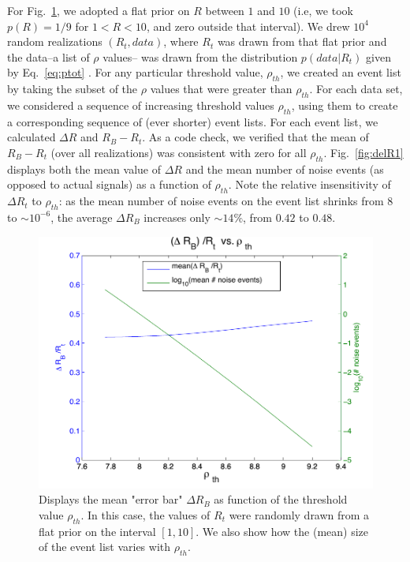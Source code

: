 \documentclass[aps,prd]{revtex4-1}
\begin{document}
For Fig.~\ref{fig:delRb}, we adopted a flat prior on $R$ between $1$ and $10$ (i.e, we took
$p(R) = 1/9$  for $1 < R <10$, and  zero outside that interval).  
We drew $10^4$ 
random realizations $(R_t, data)$, where $R_t$ was drawn from that flat prior and the data--a list of $\rho$ values-- was drawn from the distribution $p(data|R_t)$ given by Eq.~\ref{eq:ptot} .  For any particular threshold value, $\rho_{th}$, we created an  event list by taking the subset of the $\rho$ values
that were greater than $\rho_{th}$.  For each data set, we considered a sequence of increasing threshold  values $\rho_{th}$, using them to create a corresponding sequence of (ever shorter)  event lists.  For each event list, we calculated $\Delta R$ and $R_B - R_t$.
As a code check, we verified that the mean of $R_B - R_t$ (over all realizations) was consistent with zero for all $\rho_{th}$.  Fig.~\ref{fig:delR1} displays both the mean value of $\Delta R$ and the mean number of noise events (as opposed to actual signals) as a function of $\rho_{th}$. 
Note the relative insensitivity of  $\Delta R_t$ to $\rho_{th}$:  as the mean
number of noise events on the event list shrinks from $8$ to $\sim 10^{-6}$, 
the average $\Delta R_B$ increases only $\sim 14\%$, from $0.42$ to $0.48$.

\begin{figure}
\includegraphics[width=\columnwidth]{delRb}
\caption{\label{fig:delRb} Displays the mean "error bar" $\Delta R_B$ as function of the threshold value $\rho_{th}$.  In this case, the values of $R_t$ were randomly drawn from a flat prior on the interval $[1,10]$.  We also show how the (mean) size of the event list varies with $\rho_{th}$.}
\end{figure}
\end{document}
